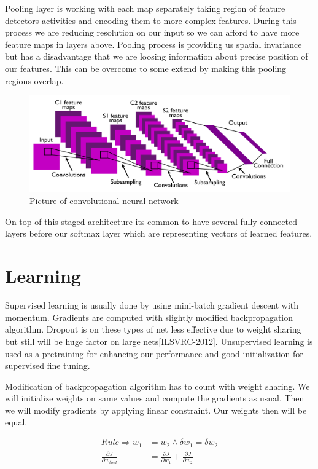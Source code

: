 Pooling layer is working with each map separately taking region of feature detectors activities and encoding them to more complex features. During this process we are reducing resolution on our input so we can afford to have more feature maps in layers above. Pooling process is providing us spatial invariance but has a disadvantage that we are loosing information about precise position of our features. This can be overcome to some extend by making this pooling regions overlap.

\begin{figure}[h]
\centering
\includegraphics[scale=0.15]{./pictures/5.png}
\caption{Picture of convolutional neural network}
\end{figure}

On top of this staged architecture its common to have several fully connected layers before our softmax layer which are representing vectors of learned features.

\section{Learning}
Supervised learning is usually done by using mini-batch gradient descent with momentum. Gradients are computed with slightly modified backpropagation algorithm. Dropout is on these  types of net less effective due to weight sharing but still will be huge factor on large nets[ILSVRC-2012]. Unsupervised learning is used as a pretraining for enhancing our performance and good initialization for supervised fine tuning.

Modification of backpropagation algorithm has to count with weight sharing. We will initialize weights on same values and compute the gradients as usual. Then we will modify gradients by applying linear constraint. Our weights then will be equal.

\begin{equation}
\begin{aligned}
Rule \Rightarrow w_1 &= w_2 \land \delta w_1 = \delta w_2 \\
\frac{\partial J}{\partial w_{tied}} &= \frac{\partial J}{\partial w_1} + \frac{\partial J}{\partial w_2}
\end{aligned}
\end{equation}

